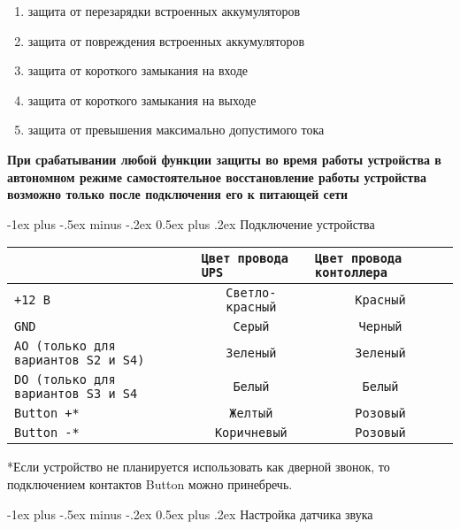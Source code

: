 \documentclass[a4paper,10pt,landscape]{article}
\makeatletter
\renewcommand{\section}{\@startsection{section}{1}{0mm}%
                                {-1ex plus -.5ex minus -.2ex}%
                                {0.5ex plus .2ex}%
                                {\normalfont\large\bfseries}}
\makeatother
\begin{document}
\begin{multicols}{3}
\begin{enumerate} 
  \item защита от перезарядки встроенных аккумуляторов    
  \item защита от повреждения встроенных аккумуляторов
  \item защита от короткого замыкания на входе
  \item защита от короткого замыкания на выходе
  \item защита от превышения максимально допустимого тока
\end{enumerate}

\textbf{При срабатывании любой функции защиты во время работы устройства в автономном режиме самостоятельное восстановление работы устройства возможно только после подключения его к питающей сети}


\section{Подключение устройства}

\noindent\begin{tabular}{p{3cm}|p{2cm}|p{2cm}}
\hline
\texttt{}&\texttt{Цвет провода UPS}&\texttt{Цвет провода контоллера}\\
\hline
\texttt{+12 В}&\multicolumn{1}{c}{\texttt{Светло-красный}}&\multicolumn{1}{c}{\texttt{Красный}}\\
\hline
\texttt{GND}&\multicolumn{1}{c}{\texttt{Серый}}&\multicolumn{1}{c}{\texttt{Черный}}\\
\hline
\texttt{AO (только для вариантов S2 и S4)}&\multicolumn{1}{c}{\texttt{Зеленый}}&\multicolumn{1}{c}{\texttt{Зеленый}}\\
\hline
\texttt{DO (только для вариантов S3 и S4}&\multicolumn{1}{c}{\texttt{Белый}}&\multicolumn{1}{c}{\texttt{Белый}}\\
\hline
\texttt{Button +*}&\multicolumn{1}{c}{\texttt{Желтый}}&\multicolumn{1}{c}{\texttt{Розовый}}\\
\hline
\texttt{Button -*}&\multicolumn{1}{c}{\texttt{Коричневый}}&\multicolumn{1}{c}{\texttt{Розовый}}\\
\hline
\end{tabular}

*Если устройство не планируется использовать как дверной звонок, то подключением контактов Button можно принебречь. 

\section{Настройка датчика звука}


\end{multicols}
\end{document}
